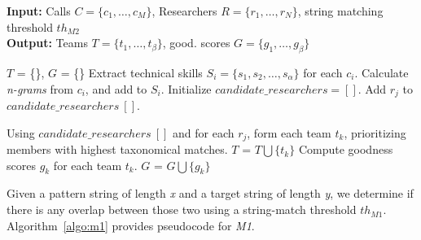 \begin{algorithm} 
	\caption{{\it M2:} Team Formation Using Taxonomical Matching} 
 {\small
 
 \begin{flushleft}
        \hspace*{\algorithmicindent} 
        \textbf{Input:} Calls $C=\{c_1, \ldots, c_M\}$, Researchers $R=\{r_1, \ldots, r_N\}$, string matching threshold $th_{M2}$\\
        \hspace*{\algorithmicindent} 
        \textbf{Output:} Teams $T=\{t_1, \ldots, t_\beta\}$, good. scores
        $G=\{g_1, \ldots, g_\beta\}$ 
 \end{flushleft}
 \label{algo:m2}
	\begin{algorithmic}[1]
                \State $T$ = \{\}, $G$ = \{\}     
                \State Extract technical skills $S_i=\{s_1, s_2, \ldots, s_\alpha\}$ for each $c_i$.
                \State Calculate \textit{n-grams} from $c_i$, and add to $S_i$.
                \State Initialize $candidate\_researchers=[]$.
                        \State Add $r_j$ to $candidate\_researchers~[]$.
                    \EndIf
                \EndFor

            \State Using $candidate\_researchers~[]$ and for each $r_j$, form each team $t_k$, prioritizing members with highest taxonomical matches.
            \State $T$ = $T \bigcup  \{t_k\}$ 
            \State Compute goodness scores $g_k$ for each team $t_k$. 
            \State $G$ = $G \bigcup  \{g_k\}$ 
        \EndFor
    \end{algorithmic} 
    }
\end{algorithm}
Given a pattern string of length \textit{x} and a target string of length \textit{y}, we determine if there is any overlap between those two using a string-match threshold $th_{M1}$. Algorithm~\ref{algo:m1} provides pseudocode for {\it M1}.


